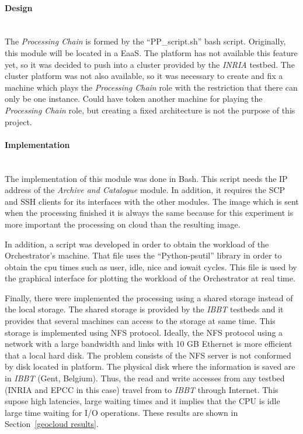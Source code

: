 \paragraph{Design}~\\

The \emph{Processing Chain} is formed by the ``PP\_script.sh'' bash
script. Originally, this module will be located in a \acl{EaaS}. The \bonfire
platform has not available this feature yet, so it was decided to push into a
cluster provided by the \emph{INRIA} testbed. The cluster platform was not also
available, so it was necessary to create and fix a machine which plays the
\emph{Processing Chain} role with the restriction that there can only be one
instance. Could have token another machine for playing the \emph{Processing
  Chain} role, but creating a fixed architecture is not the purpose of this
project.

\paragraph{Implementation}~\\

The implementation of this module was done in Bash. This script needs the
\ac{IP} address of the \emph{Archive and Catalogue} module. In addition, it
requires the \ac{SCP} and \ac{SSH} clients for its interfaces with the other
modules. The image which is sent when the processing finished it is always the
same because for this experiment is more important the processing on cloud than
the resulting image.
  
In addition, a script was developed in order to obtain the workload of the
Orchestrator's machine. That file uses the ``Python-psutil'' library in order to
obtain the cpu times such as user, idle, nice and iowait cycles. This file is
used by the graphical interface for plotting the workload of the Orchestrator at
real time.

Finally, there were implemented the processing using a shared storage instead of
the local storage. The shared storage is provided by the \emph{IBBT} testbeds
and it provides that several machines can access to the storage at same
time. This storage is implemented using \ac{NFS} protocol. Ideally, the \ac{NFS}
protocol using a network with a large bandwidth and links with 10 GB Ethernet is
more efficient that a local hard disk. The problem consists of the \ac{NFS}
server is not conformed by disk located in \bonfire platform. The physical disk
where the information is saved are in \emph{IBBT} (Gent, Belgium). Thus, the
read and write accesses from any \bonfire testbed (INRIA and EPCC in this case)
travel from \bonfire to \emph{IBBT} through Internet. This supose high
latencies, large waiting times and it implies that the CPU is idle large time
waiting for I/O operations. These results are shown in Section~\ref{geocloud
  results}.

